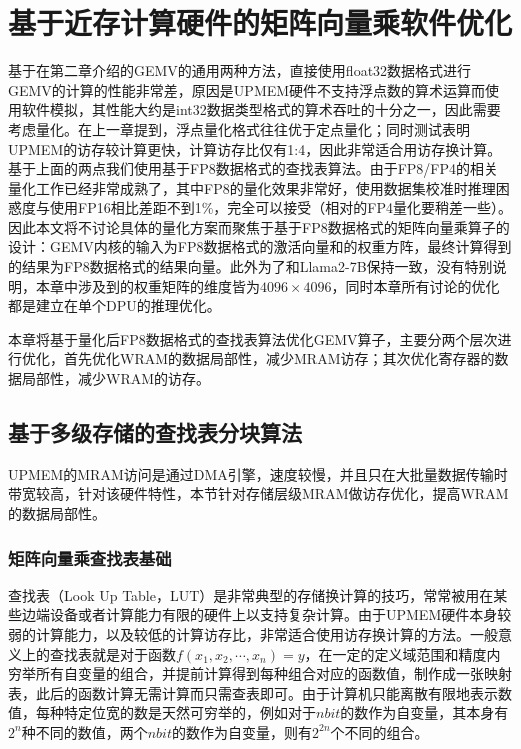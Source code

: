 \chapter{基于近存计算硬件的矩阵向量乘软件优化}
基于在第二章介绍的GEMV的通用两种方法，直接使用float32数据格式进行GEMV的计算的性能非常差，原因是UPMEM硬件不支持浮点数的算术运算而使用软件模拟，其性能大约是int32数据类型格式的算术吞吐的十分之一\cite{BenchmarkingMutlu}，因此需要考虑量化。在上一章提到，浮点量化格式往往优于定点量化\cite{ZeroQuantFP}；同时测试表明UPMEM的访存较计算更快，计算访存比仅有1:4\cite{BenchmarkingMutlu}，因此非常适合用访存换计算。基于上面的两点我们使用基于FP8数据格式\cite{FP8}的查找表算法。由于FP8/FP4的相关量化工作已经非常成熟了，其中FP8的量化效果非常好，使用数据集校准时推理困惑度与使用FP16相比差距不到1\%，完全可以接受（相对的FP4量化要稍差一些）\cite{FP8,ZeroQuantFP,FP8Power,EfficientFP8,INTorFP}。因此本文将不讨论具体的量化方案而聚焦于基于FP8数据格式的矩阵向量乘算子的设计：GEMV内核的输入为FP8数据格式的激活向量和的权重方阵，最终计算得到的结果为FP8数据格式的结果向量。此外为了和Llama2-7B保持一致，没有特别说明，本章中涉及到的权重矩阵的维度皆为$4096\times 4096$，同时本章所有讨论的优化都是建立在单个DPU的推理优化。

本章将基于量化后FP8数据格式的查找表算法优化GEMV算子，主要分两个层次进行优化，首先优化WRAM的数据局部性，减少MRAM访存；其次优化寄存器的数据局部性，减少WRAM的访存。

\section{基于多级存储的查找表分块算法}
UPMEM的MRAM访问是通过DMA引擎，速度较慢，并且只在大批量数据传输时带宽较高，针对该硬件特性，本节针对存储层级MRAM做访存优化，提高WRAM的数据局部性。

\subsection{矩阵向量乘查找表基础}
查找表（Look Up Table，LUT）是非常典型的存储换计算的技巧，常常被用在某些边端设备或者计算能力有限的硬件上以支持复杂计算。由于UPMEM硬件本身较弱的计算能力，以及较低的计算访存比，非常适合使用访存换计算的方法。一般意义上的查找表就是对于函数$f(x_1,x_2,\cdots,x_n)=y$，在一定的定义域范围和精度内穷举所有自变量的组合，并提前计算得到每种组合对应的函数值，制作成一张映射表，此后的函数计算无需计算而只需查表即可。由于计算机只能离散有限地表示数值，每种特定位宽的数是天然可穷举的，例如对于$n bit$的数作为自变量，其本身有$2^n$种不同的数值，两个$n bit$的数作为自变量，则有$2^{2n}$个不同的组合。

